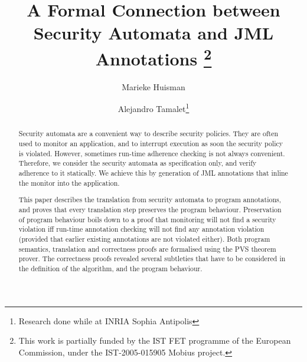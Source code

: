 \documentclass[]{llncs}
\title{A Formal Connection between Security Automata and JML Annotations
\thanks{This work is partially funded by the IST FET
programme of the European Commission, under the IST-2005-015905
\textsf{Mobius} project.}}
\author{Marieke Huisman\inst{1} \and Alejandro Tamalet\inst{2}\thanks{Research done while at INRIA Sophia Antipolis}}
\institute{INRIA Sophia Antipolis, France \and
University of Nijmegen, Netherlands}
\begin{document}
\maketitle
\begin{abstract}
Security automata are a convenient way to describe security
policies. They are often used to monitor an application, and to
interrupt execution as soon the security policy is violated. However,
sometimes run-time adherence checking is not always convenient.
Therefore, we consider the security automata as specification only,
and verify adherence to it statically. We achieve this by generation
of JML annotations that inline the monitor into the application.

This paper describes the translation from security automata to program
annotations, and proves that every translation step preserves the
program behaviour.
Preservation of program behaviour boils down to a proof
that monitoring will not find a security violation iff run-time
annotation checking will not find any annotation violation (provided
that earlier existing annotations are not violated either).
%
Both program semantics, translation and correctness proofs are
formalised using the PVS theorem prover. The correctness proofs
revealed several subtleties that have to be considered in the
definition of the algorithm, and the program behaviour.
\end{abstract}











\end{document}
